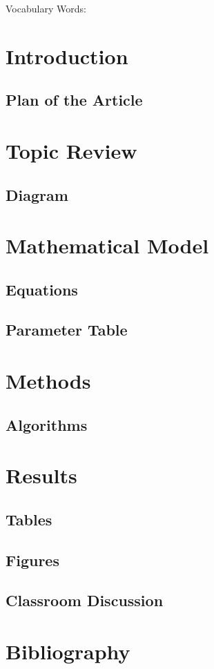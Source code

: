 
Vocabulary Words:

\section{Introduction}

\subsection{Plan of the Article}

\section{Topic Review}

\subsection{Diagram}

\section{Mathematical Model}

\subsection{Equations}

\subsection{Parameter Table}

\section{Methods}

\subsection{Algorithms}

\section{Results}

\subsection{Tables}

\subsection{Figures}

\subsection{Classroom Discussion}

\section{Bibliography}
